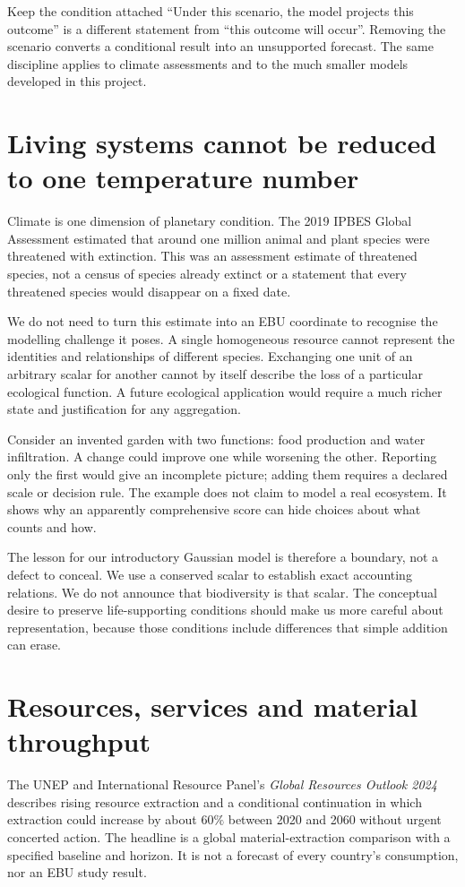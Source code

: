 \begin{cautionbox}{Keep the condition attached}
``Under this scenario, the model projects this outcome'' is a different statement from ``this outcome will occur''. Removing the scenario converts a conditional result into an unsupported forecast. The same discipline applies to climate assessments and to the much smaller models developed in this project.
\end{cautionbox}

\section{Living systems cannot be reduced to one temperature number}
Climate is one dimension of planetary condition. The 2019 IPBES Global Assessment estimated that around one million animal and plant species were threatened with extinction. This was an assessment estimate of threatened species, not a census of species already extinct or a statement that every threatened species would disappear on a fixed date.\cite{intro-ipbes}

We do not need to turn this estimate into an EBU coordinate to recognise the modelling challenge it poses. A single homogeneous resource cannot represent the identities and relationships of different species. Exchanging one unit of an arbitrary scalar for another cannot by itself describe the loss of a particular ecological function. A future ecological application would require a much richer state and justification for any aggregation.

Consider an invented garden with two functions: food production and water infiltration. A change could improve one while worsening the other. Reporting only the first would give an incomplete picture; adding them requires a declared scale or decision rule. The example does not claim to model a real ecosystem. It shows why an apparently comprehensive score can hide choices about what counts and how.

The lesson for our introductory Gaussian model is therefore a boundary, not a defect to conceal. We use a conserved scalar to establish exact accounting relations. We do not announce that biodiversity is that scalar. The conceptual desire to preserve life-supporting conditions should make us more careful about representation, because those conditions include differences that simple addition can erase.

\section{Resources, services and material throughput}
The UNEP and International Resource Panel's \emph{Global Resources Outlook 2024} describes rising resource extraction and a conditional continuation in which extraction could increase by about $60\%$ between 2020 and 2060 without urgent concerted action. The headline is a global material-extraction comparison with a specified baseline and horizon. It is not a forecast of every country's consumption, nor an EBU study result.\cite{intro-resources}

